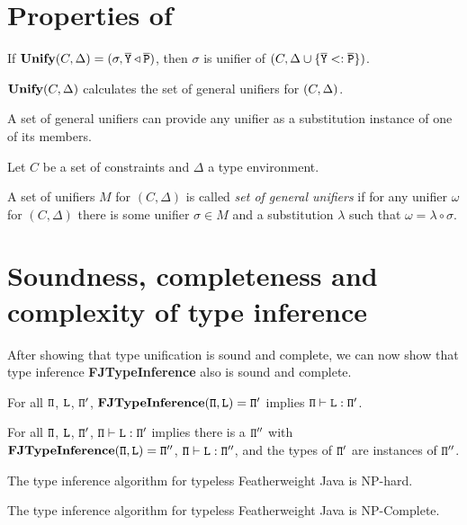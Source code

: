 \section{Properties of \unify{}}

\begin{theorem}[Soundness]
  \label{theo:unifySoundness}
   If $\textbf{Unify}{}(C, \Delta) = {(\sigma,  \overline{\tt Y} \triangleleft
     \overline{\tt P})}$, then $\sigma$ is unifier of $(C,\Delta \cup \{ \overline{\tt Y} <: \overline{\tt P} \})$. 
\end{theorem}


\begin{theorem}[Completeness]\label{theo:unifyCompleteness}
  $\textbf{Unify}{} (C, \Delta)$ calculates {the set} of general
  unifiers for $(C, \Delta)$. 
\end{theorem}

A set of general unifiers can provide any unifier as a substitution
instance of one of its members.
\begin{definition}
  Let $C$ be a set of constraints and $\Delta$ a type environment. 

  A set of unifiers $M$ for $(C, \Delta)$
  is called \emph{set of general unifiers} if for any unifier $\omega$
  for $(C, \Delta)$ there is some unifier $\sigma \in M$ and a substitution
  $\lambda$ such that $\omega = \lambda   \circ \sigma$.
\end{definition}


\section{Soundness, completeness and complexity of type inference}
\label{sec:soundn-compl-type}

After showing that type unification is sound and complete, we
can now show that type inference \textbf{FJTypeInference} also is
sound and complete.
\begin{theorem}[Soundness] For all ${\tt \Pi}$, ${\tt L}$, ${\tt \Pi'}$, 
  $\textbf{FJTypeInference}({\tt \Pi},\texttt{L}) = {\tt \Pi}'$ implies ${\tt \Pi} \vdash \texttt{L} : {\tt \Pi}'$.
\end{theorem}
\begin{theorem}[Completeness]  For all ${\tt \Pi}$, ${\tt L}$, ${\tt \Pi'}$,
  ${\tt \Pi} \vdash \texttt{L} : {\tt \Pi}'$ implies there is a
    ${\tt \Pi}''$ with $\textbf{FJTypeInference}({\tt \Pi},\texttt{L}) = {\tt \Pi}''$,
  ${\tt \Pi} \vdash \texttt{L} : {\tt \Pi}''$, and the types of ${\tt \Pi}'$ are
  instances of ${\tt \Pi}''$.
\end{theorem}

\begin{theorem}[NP-Hardness]
  \label{theo:np-hardness}
  The type inference algorithm for typeless Featherweight Java is NP-hard.
\end{theorem}


\begin{theorem}[NP-Completeness]
  \label{theo:np-completeness}
  The type inference algorithm for typeless Featherweight Java is NP-Complete.
\end{theorem}


